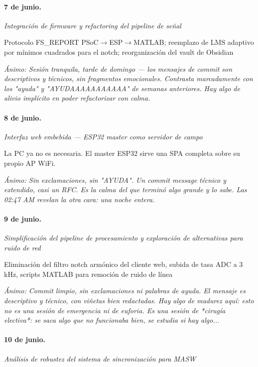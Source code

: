 \paragraph{7 de junio.}
\emph{Integración de firmware y refactoring del pipeline de señal}

Protocolo FS\_REPORT PSoC$\rightarrow$ESP$\rightarrow$MATLAB; reemplazo de LMS adaptivo por mínimos cuadrados para el notch; reorganización del vault de Obsidian

{\footnotesize\itshape \'Animo: Sesión tranquila, tarde de domingo --- los mensajes de commit son descriptivos y técnicos, sin fragmentos emocionales. Contrasta marcadamente con los "ayuda" y "AYUDAAAAAAAAAAA" de semanas anteriores. Hay algo de alivio implícito en poder refactorizar con calma.}

\paragraph{8 de junio.}
\emph{Interfaz web embebida --- ESP32 master como servidor de campo}

La PC ya no es necesaria. El master ESP32 sirve una SPA completa sobre su propio AP WiFi.

{\footnotesize\itshape \'Animo: Sin exclamaciones, sin "AYUDA". Un commit message técnico y extendido, casi un RFC. Es la calma del que terminó algo grande y lo sabe. Las 02:47 AM revelan la otra cara: una noche entera.}

\paragraph{9 de junio.}
\emph{Simplificación del pipeline de procesamiento y exploración de alternativas para ruido de red}

Eliminación del filtro notch armónico del cliente web, subida de tasa ADC a 3 kHz, scripts MATLAB para remoción de ruido de línea

{\footnotesize\itshape \'Animo: Commit limpio, sin exclamaciones ni palabras de ayuda. El mensaje es descriptivo y técnico, con viñetas bien redactadas. Hay algo de madurez aquí: esto no es una sesión de emergencia ni de euforia. Es una sesión de *cirugía electiva*: se saca algo que no funcionaba bien, se estudia si hay algo...}

\paragraph{10 de junio.}
\emph{Análisis de robustez del sistema de sincronización para MASW}

